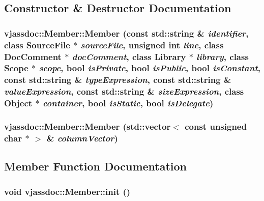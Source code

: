 \subsection{Constructor \& Destructor Documentation}
\hypertarget{classvjassdoc_1_1Member_7d85b6523c38a202e0c5e05c2b28c51a}{
\subsubsection{\setlength{\rightskip}{0pt plus 5cm}vjassdoc::Member::Member (const std::string \& {\em identifier}, class {\bf SourceFile} $\ast$ {\em sourceFile}, unsigned int {\em line}, class {\bf DocComment} $\ast$ {\em docComment}, class {\bf Library} $\ast$ {\em library}, class {\bf Scope} $\ast$ {\em scope}, bool {\em isPrivate}, bool {\em isPublic}, bool {\em isConstant}, const std::string \& {\em typeExpression}, const std::string \& {\em valueExpression}, const std::string \& {\em sizeExpression}, class {\bf Object} $\ast$ {\em container}, bool {\em isStatic}, bool {\em isDelegate})}}
\label{classvjassdoc_1_1Member_7d85b6523c38a202e0c5e05c2b28c51a}


\hypertarget{classvjassdoc_1_1Member_6a4d211407bef23d4a7cd4c70f5ca8f7}{
\subsubsection{\setlength{\rightskip}{0pt plus 5cm}vjassdoc::Member::Member (std::vector$<$ const unsigned char $\ast$ $>$ \& {\em columnVector})}}
\label{classvjassdoc_1_1Member_6a4d211407bef23d4a7cd4c70f5ca8f7}




\subsection{Member Function Documentation}
\hypertarget{classvjassdoc_1_1Member_eccac74ca5ea37e82d322c20b5aa2efc}{
\subsubsection{\setlength{\rightskip}{0pt plus 5cm}void vjassdoc::Member::init ()}}
\label{classvjassdoc_1_1Member_eccac74ca5ea37e82d322c20b5aa2efc}





